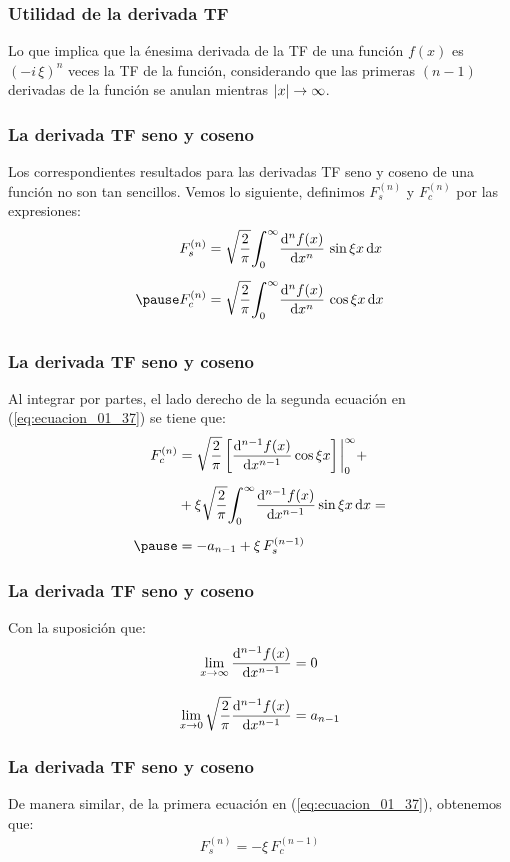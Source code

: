 \begin{frame}
  \frametitle{Utilidad de la derivada TF}
Lo que implica que la énesima derivada de la TF de una función $f (x)$ es $(- i \, \xi)^{n}$ veces la TF de la función, considerando que las primeras $(n - 1)$ derivadas de la función se anulan mientras $\abs{x} \to \infty$.
\end{frame}
\begin{frame}
\frametitle{La derivada TF seno y coseno}
Los correspondientes resultados para las derivadas TF seno y coseno de una función no son tan sencillos. \pause Vemos lo siguiente, definimos $F_{s}^{(n)}$ y $F_{c}^{(n)}$ por las expresiones:
\pause
\begin{eqnarray}
\begin{aligned}
F_{s}^{(n)} &= \sqrt{\dfrac{2}{\pi}} \scaleint{6ex}_{\bs 0}^{\infty} \dv[n]{f (x)}{x} \, \sin \xi x \dd{x} \\[0.5em] \pause
F_{c}^{(n)} &= \sqrt{\dfrac{2}{\pi}} \scaleint{6ex}_{\bs 0}^{\infty} \dv[n]{f (x)}{x} \, \cos \xi x \dd{x} \\[0.5em]
\end{aligned}
\label{eq:ecuacion_01_37}
\end{eqnarray}
\end{frame}
\begin{frame}
\frametitle{La derivada TF seno y coseno}
Al integrar por partes, el lado derecho de la segunda ecuación en (\ref{eq:ecuacion_01_37}) se tiene que:
\pause
\begin{eqnarray}
\begin{aligned}[b]
F_{c}^{(n)} &= \sqrt{\dfrac{2}{\pi}} \, \bigg[ \dv[n-1]{f (x)}{x} \cos \xi x \bigg] \eval_{0}^{\infty} + \\[0.5em]
&+ \xi \sqrt{\dfrac{2}{\pi}} \scaleint{6ex}_{\bs 0}^{\infty} \dv[n-1]{f (x)}{x} \sin \xi x \dd{x} = \\[0.5em] \pause
&= -a_{n-1} + \xi \, F_{s}^{(n-1)}
\end{aligned}
\label{eq:ecuacion_01_38}
\end{eqnarray}
\end{frame}
\begin{frame}
\frametitle{La derivada TF seno y coseno}
Con la suposición que:
\pause
\begin{align*}
\lim_{x \to \infty} \dv[n-1]{f (x)}{x} &= 0 \\[1em]
\lim_{x \to 0}  \sqrt{\dfrac{2}{\pi}} \dv[n-1]{f (x)}{x} &= a_{n-1}
\end{align*}
\end{frame}
\begin{frame}
\frametitle{La derivada TF seno y coseno}
De manera similar, de la primera ecuación en (\ref{eq:ecuacion_01_37}), obtenemos que:
\pause
\begin{align}
F_{s}^{(n)} = - \xi \, F_{c}^{(n-1)}
\label{eq:ecuacion_01_39}
\end{align}
\end{frame}
